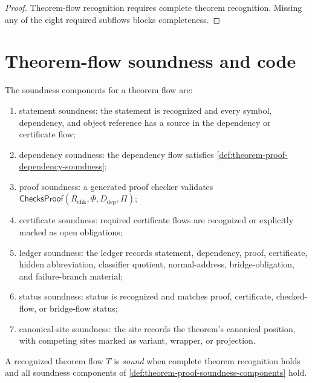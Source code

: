 \begin{proof}
Theorem-flow recognition requires complete theorem recognition. Missing any of the eight required subflows blocks completeness.
\end{proof}

\section{Theorem-flow soundness and code}
\label{sec:theorem-proof-soundness-code}

\begin{definition}
\label{def:theorem-proof-soundness-components}
The soundness components for a theorem flow are:
\begin{enumerate}
\item statement soundness: the statement is recognized and every symbol, dependency, and object reference has a source in the dependency or certificate flow;
\item dependency soundness: the dependency flow satisfies \autoref{def:theorem-proof-dependency-soundness};
\item proof soundness: a generated proof checker validates $\mathsf{ChecksProof}(R_{\mathrm{chk}},\Phi,D_{\mathrm{dep}},\Pi)$;
\item certificate soundness: required certificate flows are recognized or explicitly marked as open obligations;
\item ledger soundness: the ledger records statement, dependency, proof, certificate, hidden abbreviation, classifier quotient, normal-address, bridge-obligation, and failure-branch material;
\item status soundness: status is recognized and matches proof, certificate, checked-flow, or bridge-flow status;
\item canonical-site soundness: the site records the theorem's canonical position, with competing sites marked as variant, wrapper, or projection.
\end{enumerate}
\end{definition}

\begin{definition}
\label{def:theorem-proof-sound-theorem-flow}
A recognized theorem flow $T$ is \emph{sound} when complete theorem recognition holds and all soundness components of \autoref{def:theorem-proof-soundness-components} hold.
\end{definition}

